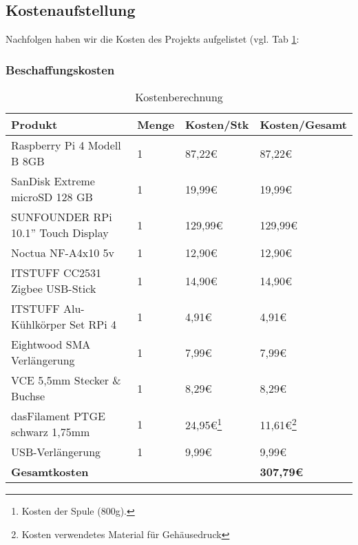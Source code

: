 \subsection{Kostenaufstellung}\label{ku_kosten}
Nachfolgen haben wir die Kosten des Projekts aufgelistet (vgl. Tab \ref{tab:ku_kostenberechnung}: \par
\subsubsection{Beschaffungskosten}\label{ku_kosten_beschaffung}
\begin{center}
\begin{table}[H]
    \begin{tabularx}{\textwidth}{|p{5.6cm}|p{1.2cm}|p{3.5cm}|p{3.5cm}|}
        \hline
 	    \textbf{Produkt} & \textbf{Menge} & \textbf{Kosten/Stk}  & \textbf{Kosten/Gesamt}\\
	    \hline
	    Raspberry Pi 4 Modell B 8GB & 1 & 87,22\euro{} & 87,22\euro{} \\
	    \hline
	    SanDisk Extreme microSD 128 GB & 1 & 19,99\euro{} & 19,99\euro{} \\
	    \hline
	    SUNFOUNDER RPi 10.1'' Touch Display & 1 & 129,99\euro{} & 129,99\euro{} \\
	    \hline
	    Noctua NF-A4x10 5v & 1 & 12,90\euro{} & 12,90\euro{} \\
	    \hline
	    ITSTUFF CC2531 Zigbee USB-Stick & 1 & 14,90\euro{} & 14,90\euro{} \\
	    \hline
	    ITSTUFF Alu-Kühlkörper Set RPi 4 & 1 & 4,91\euro{} & 4,91\euro{} \\
	    \hline
	    Eightwood SMA Verlängerung & 1 & 7,99\euro{} & 7,99\euro{} \\ 
	    \hline
	    VCE 5,5mm Stecker \& Buchse & 1 & 8,29\euro{} & 8,29\euro{} \\
	    \hline
	    dasFilament PTGE schwarz 1,75mm & 1 & 24,95\euro{}\footnote{Kosten der Spule (800g).} & 11,61\euro{}\footnote{Kosten verwendetes Material für Gehäusedruck} \\
	    \hline
	    USB-Verlängerung & 1 & 9,99\euro{} & 9,99\euro{}\\
	    \hline
	    \textbf{Gesamtkosten} &  &  & \textbf{307,79\euro{}} \\ %
	    \hline
    \end{tabularx}
    \caption{Kostenberechnung}
    \label{tab:ku_kostenberechnung}
\end{table}
\end{center}

